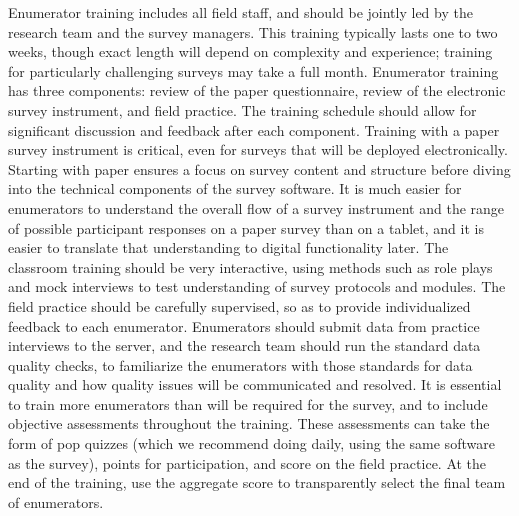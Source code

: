 Enumerator training includes all field staff,
and should be jointly led by the research team 
and the survey managers. 
This training typically lasts one to two weeks, 
though exact length will depend on complexity and experience; 
training for particularly challenging surveys may take a full month.
Enumerator training has three components: review of the paper questionnaire,
review of the electronic survey instrument, and field practice. 
The training schedule should allow for significant discussion and feedback
after each component. 
Training with a paper survey instrument is critical, 
even for surveys that will be deployed electronically. 
Starting with paper ensures a focus on survey content and structure
before diving into the technical components of the survey software.
It is much easier for enumerators to understand
the overall flow of a survey instrument and 
the range of possible participant responses
on a paper survey than on a tablet,
and it is easier to translate that understanding to 
digital functionality later.
The classroom training should be very interactive, using methods such as role plays
and mock interviews to test understanding of survey protocols and modules.
The field practice should be carefully supervised, 
so as to provide individualized feedback to each enumerator. 
Enumerators should submit data from practice interviews to the server,
and the research team should run the standard data quality checks,
to familiarize the enumerators with those standards for data quality 
and how quality issues will be communicated and resolved. 
It is essential to train more enumerators than will be required 
for the survey, 
and to include objective assessments throughout the training.
These assessments can take the form of pop quizzes (which we recommend doing daily,
using the same software as the survey), points for participation, 
and score on the field practice. 
At the end of the training, use the aggregate score to transparently select the final team of enumerators.


